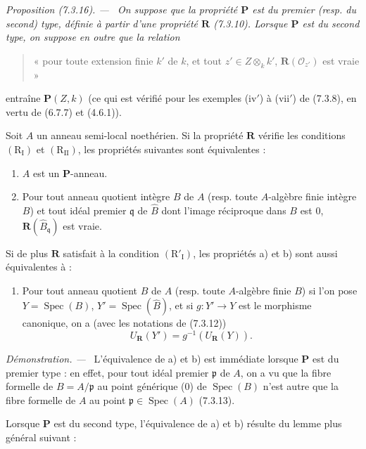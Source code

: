\documentclass[10pt,oneside]{book}
\newenvironment{proposition}[1][]{%
  \par\medskip\noindent\itshape Proposition (#1). ---\ }{\par}
\newenvironment{proof}{%
  \par\medskip\noindent\textit{Démonstration. ---\ }}{\par}
\begin{document}
\begin{proposition}[7.3.16]
\label{IV.2.s7.3.16-fr}
On suppose que la propriété $\boldsymbol P$ est du premier (resp. du
second) type, définie à partir d'une propriété $\boldsymbol R$ (7.3.10).
Lorsque $\boldsymbol P$ est du second type, on suppose en outre que la
relation
\begin{quote}
« pour toute extension finie $k'$ de $k$, et tout
$z'\in Z\otimes_k k'$, $\boldsymbol R(\mathscr O_{z'})$ est vraie »
\end{quote}
entraîne $\boldsymbol P(Z,k)$ (ce qui est vérifié pour les exemples
(iv$'$) à (vii$'$) de (7.3.8), en vertu de (6.7.7) et (4.6.1)).

Soit $A$ un anneau semi-local noethérien. Si la propriété
$\boldsymbol R$ vérifie les conditions $(\mathrm R_{\mathrm I})$ et
$(\mathrm R_{\mathrm{II}})$, les propriétés suivantes sont équivalentes :
\begin{enumerate}
\item[\emph{a)}] $A$ est un $\boldsymbol P$-anneau.
\item[\emph{b)}] Pour tout anneau quotient intègre $B$ de $A$ (resp. toute
$A$-algèbre finie intègre $B$) et tout idéal premier $\mathfrak q$ de
$\widehat B$ dont l'image réciproque dans $B$ est 0,
$\boldsymbol R(\widehat B_{\mathfrak q})$ est vraie.
\end{enumerate}
Si de plus $\boldsymbol R$ satisfait à la condition
$(\mathrm R'_{\mathrm I})$, les propriétés a) et b) sont aussi
équivalentes à :
\begin{enumerate}
\item[\emph{c)}] Pour tout anneau quotient $B$ de $A$ (resp. toute $A$-algèbre finie
$B$) si l'on pose $Y=\operatorname{Spec}(B)$,
$Y'=\operatorname{Spec}(\widehat B)$, et si $g:Y'\to Y$ est le morphisme
canonique, on a (avec les notations de (7.3.12))
\begin{equation}
U_{\boldsymbol R}(Y')=g^{-1}(U_{\boldsymbol R}(Y)).
\tag{7.3.16.1}
\label{IV.2.eq.7.3.16.1-fr}
\end{equation}
\end{enumerate}
\end{proposition}

\begin{proof}
L'équivalence de a) et b) est immédiate lorsque $\boldsymbol P$ est du
premier type : en effet, pour tout idéal premier $\mathfrak p$ de $A$, on
a vu que la fibre formelle de $B=A/\mathfrak p$ au point générique (0) de
$\operatorname{Spec}(B)$ n'est autre que la fibre formelle de $A$ au
point $\mathfrak p\in\operatorname{Spec}(A)$ (7.3.13).

Lorsque $\boldsymbol P$ est du second type, l'équivalence de a) et b)
résulte du lemme plus général suivant :
\end{proof}
\end{document}
